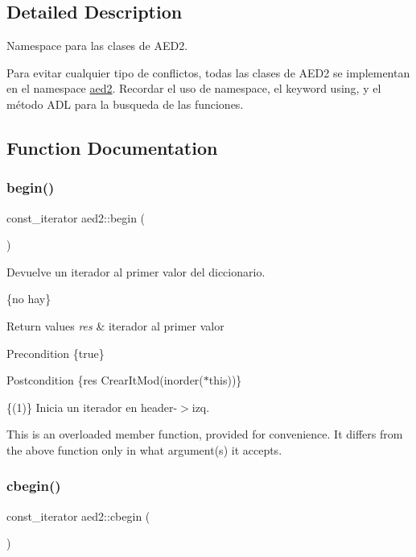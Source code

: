 \subsection{Detailed Description}
Namespace para las clases de A\+E\+D2. 

Para evitar cualquier tipo de conflictos, todas las clases de A\+E\+D2 se implementan en el namespace \hyperlink{namespaceaed2}{aed2}. Recordar el uso de {\ttfamily namespace}, el keyword {\ttfamily using}, y el método A\+DL para la busqueda de las funciones. 

\subsection{Function Documentation}
\mbox{\label{namespaceaed2_a669d2fcf59e6ec1fe40105ba395768b6}} 
\subsubsection{\texorpdfstring{begin()}{begin()}}
{\footnotesize\ttfamily const\+\_\+iterator aed2\+::begin (\begin{DoxyParamCaption}{ }\end{DoxyParamCaption})}



Devuelve un iterador al primer valor del diccionario. 

\{no hay\}


\begin{DoxyRetVals}{Return values}
{\em res} & iterador al primer valor\\
\hline
\end{DoxyRetVals}
\begin{DoxyPrecond}{Precondition}
\{true\} 
\end{DoxyPrecond}
\begin{DoxyPostcond}{Postcondition}
\{res  Crear\+It\+Mod(inorder($\ast$this))\}
\end{DoxyPostcond}
\{(1)\} Inicia un iterador en header-\/$>$izq.

This is an overloaded member function, provided for convenience. It differs from the above function only in what argument(s) it accepts. \mbox{\label{namespaceaed2_ac1c803de21070eb6f9b7fa3e2035bc22}} 
\subsubsection{\texorpdfstring{cbegin()}{cbegin()}}
{\footnotesize\ttfamily const\+\_\+iterator aed2\+::cbegin (\begin{DoxyParamCaption}{ }\end{DoxyParamCaption})}

